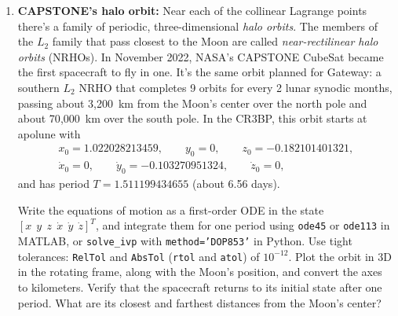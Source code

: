 \documentclass[11pt,letterpaper]{article}
\begin{document}
\begin{enumerate}[label=(\alph*)]
    \item \textbf{CAPSTONE's halo orbit:} Near each of the collinear Lagrange points there's a family of periodic, three-dimensional \emph{halo orbits}. The members of the $L_2$ family that pass closest to the Moon are called \emph{near-rectilinear halo orbits} (NRHOs). In November 2022, NASA's CAPSTONE CubeSat became the first spacecraft to fly in one. It's the same orbit planned for Gateway: a southern $L_2$ NRHO that completes 9 orbits for every 2 lunar synodic months, passing about 3{,}200~km from the Moon's center over the north pole and about 70{,}000~km over the south pole. In the CR3BP, this orbit starts at apolune with
    \[
    \begin{gathered}
    x_0 = 1.022028213459, \qquad y_0 = 0, \qquad z_0 = -0.182101401321, \\
    \dot x_0 = 0, \qquad \dot y_0 = -0.103270951324, \qquad \dot z_0 = 0,
    \end{gathered}
    \]
    and has period $T = 1.511199434655$ (about 6.56 days).
    
Write the equations of motion as a first-order ODE in the state $[x\;\,y\;\,z\;\,\dot x\;\,\dot y\;\,\dot z]^T$, and integrate them for one period using \texttt{ode45} or \texttt{ode113} in MATLAB, or \texttt{solve\_ivp} with \texttt{method='DOP853'} in Python. Use tight tolerances: \texttt{RelTol} and \texttt{AbsTol} (\texttt{rtol} and \texttt{atol}) of $10^{-12}$. Plot the orbit in 3D in the rotating frame, along with the Moon's position, and convert the axes to kilometers. Verify that the spacecraft returns to its initial state after one period. What are its closest and farthest distances from the Moon's center?

\end{enumerate}
\end{document}
